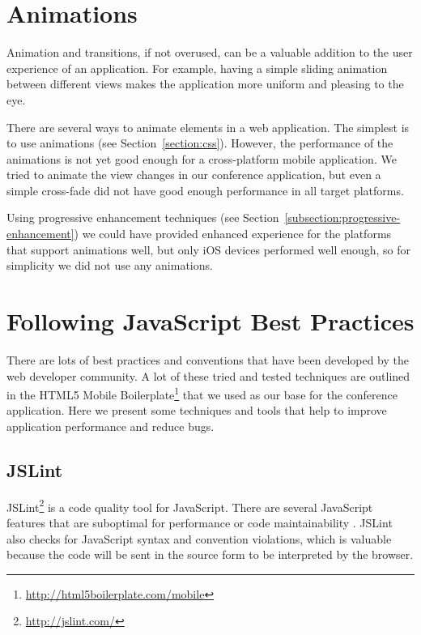 \section{Animations}
\label{section:animations}

Animation and transitions, if not overused, can be a valuable addition
to the user experience of an application. For example, having a simple
sliding animation between different views makes the application more
uniform and pleasing to the eye.

There are several ways to animate elements in a web application. The
simplest is to use  animations (see
Section~\ref{section:css}). However, the performance of the animations
is not yet good enough for a cross-platform mobile application. We
tried to animate the view changes in our conference application, but
even a simple cross-fade did not have good enough performance in all
target platforms.

Using progressive enhancement techniques (see
Section~\ref{subsection:progressive-enhancement}) we could have
provided enhanced experience for the platforms that support animations
well, but only iOS devices performed well enough, so for simplicity we
did not use any animations.

\section{Following JavaScript Best Practices}
\label{section:js-best-practices}

There are lots of best practices and conventions that have been
developed by the web developer community. A lot of these tried and
tested techniques are outlined in the HTML5 Mobile
Boilerplate\footnote{\url{http://html5boilerplate.com/mobile}} that we
used as our base for the conference application. Here we present some
techniques and tools that help to improve application performance and
reduce bugs.

\subsection{JSLint}

JSLint\footnote{\url{http://jslint.com/}} is a code quality tool for
JavaScript. There are several JavaScript features that are suboptimal
for performance or code maintainability
\cite{crockford2008javascript}. JSLint also checks for JavaScript
syntax and convention violations, which is valuable because the code
will be sent in the source form to be interpreted by the browser.

